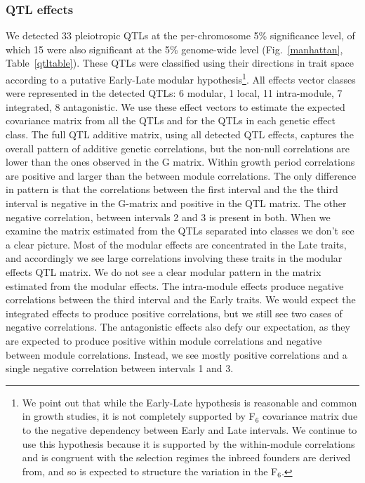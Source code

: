 \begin{refsection}
\subsubsection{QTL effects}

We detected 33 pleiotropic QTLs at the per-chromosome 5\% significance level,
of which 15 were also significant at the 5\% genome-wide level
(Fig.~\ref{manhattan}, Table~\ref{qtltable}). These QTLs were classified using
their directions in trait space according to a putative Early-Late modular
hypothesis\footnote{We point out that while the Early-Late hypothesis is
reasonable and common in growth studies, it is not completely supported by
F$_{\text{6}}$ covariance matrix due to the negative dependency between Early
and Late intervals. We continue to use this hypothesis because it is supported
by the within-module correlations and is congruent with the selection regimes
the inbreed founders are derived from, and so is expected to structure the
variation in the F$_{\text{6}}$.}. All effects vector classes were represented
in the detected QTLs: 6 modular, 1 local, 11 intra-module, 7 integrated, 8
antagonistic. We use these effect vectors to estimate the expected covariance
matrix from all the QTLs and for the QTLs in each genetic effect class. The
full QTL additive matrix, using all detected QTL effects, captures the overall
pattern of additive genetic correlations, but the non-null correlations are
lower than the ones observed in the G matrix. Within growth period
correlations are positive and larger than the between module correlations. The
only difference in pattern is that the correlations between the first interval
and the the third interval is negative in the G-matrix and positive in the QTL
matrix. The other negative correlation, between intervals 2 and 3 is present
in both. When we examine the matrix estimated from the QTLs separated into
classes we don't see a clear picture. Most of the modular effects are
concentrated in the Late traits, and accordingly we see large correlations
involving these traits in the modular effects QTL matrix. We do not see a
clear modular pattern in the matrix estimated from the modular effects. The
intra-module effects produce negative correlations between the third interval
and the Early traits. We would expect the integrated effects to produce
positive correlations, but we still see two cases of negative correlations.
The antagonistic effects also defy our expectation, as they are expected to
produce positive within module correlations and negative between module
correlations. Instead, we see mostly positive correlations and a single
negative correlation between intervals 1 and 3.



\end{refsection}
